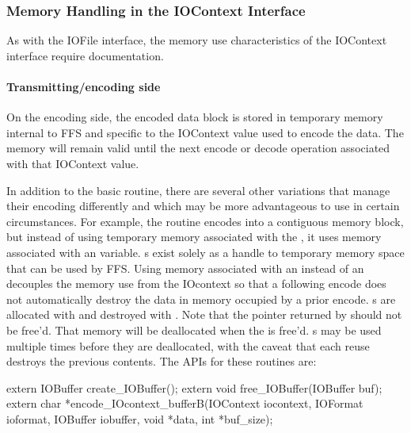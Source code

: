 \subsubsection{Memory Handling in the IOContext Interface}

As with the IOFile interface, the memory use characteristics of the IOContext
interface require documentation.  

\paragraph{Transmitting/encoding side}
On the encoding side, the encoded data block is stored in temporary memory
internal to FFS and specific to the IOContext value used to encode the data.
The memory will remain valid until the next encode or decode operation
associated with that IOContext value.  

In addition to the basic  routine,
there are several other variations that manage their encoding differently
and which may be more advantageous to use in certain circumstances.  For
example, the routine  encodes into a
contiguous memory block, but instead of using temporary memory associated
with the , it uses memory associated with an
 variable.  s exist solely as a handle
to temporary memory space that can be used by FFS.  Using memory associated
with an  instead of an  decouples the
memory use from the IOcontext so that a following encode does not
automatically destroy the data in memory occupied by a prior encode.
s are allocated with  and
destroyed with .  Note that the pointer returned
by  should not be free'd.  That memory
will be deallocated when the  is free'd.
s may be used multiple times before they are deallocated,
with the caveat that each reuse destroys the previous contents.
The APIs for these routines are:
\begin{WrapCode}
extern IOBuffer create_IOBuffer();
extern void free_IOBuffer(IOBuffer buf);
extern char *encode_IOcontext_bufferB(IOContext iocontext, IOFormat ioformat, IOBuffer iobuffer, 
                                      void *data, int *buf_size);
\end{WrapCode}

